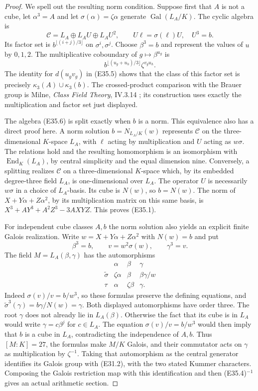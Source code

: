 \begin{proof}
We spell out the resulting norm condition.
Suppose first that $A$ is not a cube, let
$\alpha^3=A$ and let $\sigma(\alpha)=\zeta\alpha$ generate
$\operatorname{Gal}(L_A/K)$.
The cyclic algebra is
\[
 \mathcal C=L_A\oplus L_A U\oplus L_A U^2,\qquad
 U\ell=\sigma(\ell)U,\quad U^3=b .
 \tag{E35.6}
\]
Its factor set is
$b^{\lfloor(i+j)/3\rfloor}$ on $\sigma^i,\sigma^j$.
Choose $\beta^3=b$ and represent the values of $u$ by
$0,1,2$. The multiplicative coboundary of
$g\mapsto\beta^{u_g}$ is
\[
 b^{\lfloor(u_g+u_h)/3\rfloor}\zeta^{v_gu_h}.
 \tag{E35.7}
\]
The identity for $d(u_gv_g)$ in (E35.5) shows that the
class of this factor set is precisely
$\kappa_3(A)\cup\kappa_3(b)$.
The crossed-product comparison with the Brauer group is
Milne, \emph{Class Field Theory}, IV.3.14
\cite{E_MilneCFT}; its construction uses exactly the
multiplication and factor set just displayed.

The algebra (E35.6) is split exactly when $b$ is a norm.
This equivalence also has a direct proof here.
A norm solution $b=N_{L_A/K}(w)$ represents $\mathcal C$
on the three-dimensional $K$-space $L_A$, with $\ell$
acting by multiplication and $U$ acting as $w\sigma$.
The relations hold and the resulting homomorphism is an
isomorphism with $\operatorname{End}_K(L_A)$, by central
simplicity and the equal dimension nine.
Conversely, a splitting realizes $\mathcal C$ on a
three-dimensional $K$-space which, by its embedded
degree-three field $L_A$, is one-dimensional over $L_A$.
The operator $U$ is necessarily $w\sigma$ in a choice
of $L_A$-basis. Its cube is $N(w)$, so $b=N(w)$.
The norm of $X+Y\alpha+Z\alpha^2$, by its multiplication
matrix on this same basis, is
$X^3+A Y^3+A^2Z^3-3AXYZ$.
This proves (E35.1).

For independent cube classes $A,b$ the norm solution
also yields an explicit finite Galois realization.
Write $w=X+Y\alpha+Z\alpha^2$ with $N(w)=b$ and put
\[
 \beta^3=b,\qquad
 v=w^2\sigma(w),\qquad \gamma^3=v.
 \tag{E35.8}
\]
The field $M=L_A(\beta,\gamma)$ has the automorphisms
\[
 \begin{array}{c|ccc}
       &\alpha&\beta&\gamma\\ \hline
 \widetilde\sigma&\zeta\alpha&\beta&\beta\gamma/w\\
 \tau&\alpha&\zeta\beta&\gamma .
 \end{array}
 \tag{E35.9}
\]
Indeed $\sigma(v)/v=b/w^3$, so these formulas preserve
the defining equations, and
$\widetilde\sigma^3(\gamma)
=b\gamma/N(w)=\gamma$.
Both displayed automorphisms have order three.
The root $\gamma$ does not already lie in $L_A(\beta)$.
Otherwise the fact that its cube is in $L_A$ would write
$\gamma=c\beta^j$ for $c\in L_A$.
The equation $\sigma(v)/v=b/w^3$ would then imply that
$b$ is a cube in $L_A$, contradicting the independence
of $A,b$.
Thus $[M:K]=27$, the formulas make $M/K$ Galois, and
their commutator acts on $\gamma$ as multiplication by
$\zeta^{-1}$. Taking that automorphism as the central
generator identifies its Galois group with (E31.2),
with the two stated Kummer characters. Composing the
Galois restriction map with this identification and then
(E35.4)$^{-1}$ gives an actual arithmetic section.


\end{proof}

